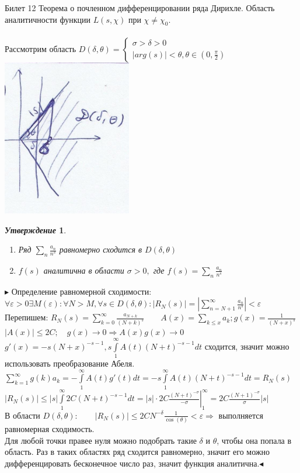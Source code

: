 \documentclass[a4paper,12pt]{article}
\newtheorem{utv}{\textit{Утверждение}}
\newcommand{\TE}{\theta}
\newcommand{\q}{\quad}
\newcommand{\pb}{\blacktriangleright}
\newcommand{\pe}{\blacktriangleleft}
\newcommand{\Ra}{\Rightarrow}
\newcommand{\SL}{\sum\limits}
\newcommand{\IL}{\int\limits}
\begin{document}
\newpage
\begin{mybox}{\hypertarget{bil12}{Билет 12}}
Теорема о почленном дифференцировании ряда Дирихле. Область аналитичности функции $L(s, \chi)$ при $\chi \not= \chi_0$.\\\q\\
Рассмотрим область $D(\delta, \TE) = \begin{cases} \sigma > \delta > 0\\|arg(s)| < \TE, \TE \in (0, \frac{\pi}{2})\end{cases}$\\
\includegraphics{p3.png}\q\\
\begin{utv}\q\\
\begin{enumerate}
\item Ряд $\SL_n \frac{a_n}{n^s} $ равномерно сходится в $D(\delta, \TE)$
\item $f(s)$ аналитична в области $\sigma > 0,$ где $f(s) = \SL_n\frac{a_n}{n^s}$
\end{enumerate}
\end{utv}
$\pb$ Определение равномерной сходимости: $\forall \varepsilon > 0 \exists M(\varepsilon): \forall N > M, \forall s\in D(\delta, \TE): |R_N(s)| = |\SL_{n = N+1}^\infty \frac{a_n}{n^s}| < \varepsilon$\\
Перепишем: $R_N(s) = \SL_{k=0}^\infty \frac{a_{N+k}}{(N+k)^s}\q\q A(x) = \SL_{k\le x}a_k; g(x) = \frac{1}{(N+x)^s}$\\
$|A(x)| \le 2C; \q g(x) \to 0\Ra A(x)g(x)\to0$\\
$g'(x) = -s(N+x)^{-s-1}, s\IL_1^\infty A(t)(N+t)^{-s-1}dt $ сходится, значит можно использовать преобразование Абеля.\\
$\SL_{k=1}^\infty g(k) a_k = -\IL_1^\infty A(t) g'(t) dt = -s\IL_1^\infty A(t)(N+t)^{-s-1}dt = R_N(s) $\\
$|R_N(s)| \le |s|\IL_1^\infty 2C(N+t)^{-s-1}dt = |s| \cdot 2C\left.\frac{(N+t)^{-\sigma}}{-\sigma}\right|_1^\infty = 2C\frac{(N+1)^{-\sigma}}{\sigma}|s|$\\
В области $D(\delta, \TE): \q\q |R_N(s)|\le 2CN^{-\delta}\frac{1}{\cos(\TE)} < \varepsilon \Ra$ выполняется равномерная сходимость.\\
Для любой точки правее нуля можно подобрать такие $\delta$ и $\TE$, чтобы она попала в область. Раз в таких областях ряд сходится равномерно, значит его можно дифференцировать бесконечное число раз, значит функция аналитична.$\pe$

\end{mybox}
\end{document}
